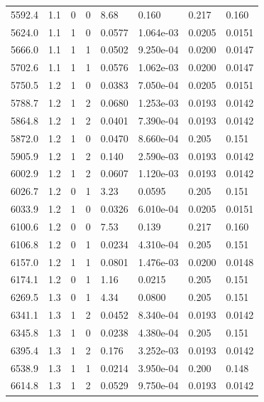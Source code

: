 \documentclass[preview]{standalone}
\begin{document}
{{{\begin{tabular}{L{1.2cm}C{1.2cm} C{0.3cm}C{0.5cm} C{1.4cm}C{1.4cm} C{1.4cm}C{1.4cm}}
  5592.4  &   1.1  & 0     &  0 &  8.68  & 0.160  & 0.217 &  0.160   \\ 
  5624.0  &   1.1  & 1     &  0 &  0.0577  & 1.064e-03  & 0.0205 &  0.0151   \\ 
  5666.0  &   1.1  & 1     &  1 &  0.0502  & 9.250e-04  & 0.0200 &  0.0147   \\ 
  5702.6  &   1.1  & 1     &  1 &  0.0576  & 1.062e-03  & 0.0200 &  0.0147   \\ 
  5750.5  &   1.2  & 1     &  0 &  0.0383  & 7.050e-04  & 0.0205 &  0.0151   \\ 
  5788.7  &   1.2  & 1     &  2 &  0.0680  & 1.253e-03  & 0.0193 &  0.0142   \\ 
  5864.8  &   1.2  & 1     &  2 &  0.0401  & 7.390e-04  & 0.0193 &  0.0142   \\ 
  5872.0  &   1.2  & 1     &  0 &  0.0470  & 8.660e-04  & 0.205 &  0.151   \\ 
  5905.9  &   1.2  & 1     &  2 &  0.140  & 2.590e-03  & 0.0193 &  0.0142   \\ 
  6002.9  &   1.2  & 1     &  2 &  0.0607  & 1.120e-03  & 0.0193 &  0.0142   \\ 
  6026.7  &   1.2  & 0     &  1 &  3.23  & 0.0595  & 0.205 &  0.151   \\ 
  6033.9  &   1.2  & 1     &  0 &  0.0326  & 6.010e-04  & 0.0205 &  0.0151   \\ 
  6100.6  &   1.2  & 0     &  0 &  7.53  & 0.139  & 0.217 &  0.160   \\ 
  6106.8  &   1.2  & 0     &  1 &  0.0234  & 4.310e-04  & 0.205 &  0.151   \\ 
  6157.0  &   1.2  & 1     &  1 &  0.0801  & 1.476e-03  & 0.0200 &  0.0148   \\ 
  6174.1  &   1.2  & 0     &  1 &  1.16  & 0.0215  & 0.205 &  0.151   \\ 
  6269.5  &   1.3  & 0     &  1 &  4.34  & 0.0800  & 0.205 &  0.151   \\ 
  6341.1  &   1.3  & 1     &  2 &  0.0452  & 8.340e-04  & 0.0193 &  0.0142   \\ 
  6345.8  &   1.3  & 1     &  0 &  0.0238  & 4.380e-04  & 0.205 &  0.151   \\ 
  6395.4  &   1.3  & 1     &  2 &  0.176  & 3.252e-03  & 0.0193 &  0.0142   \\ 
  6538.9  &   1.3  & 1     &  1 &  0.0214  & 3.950e-04  & 0.200 &  0.148   \\ 
  6614.8  &   1.3  & 1     &  2 &  0.0529  & 9.750e-04  & 0.0193 &  0.0142   \\ 

\end{tabular}}}}
\end{document}
